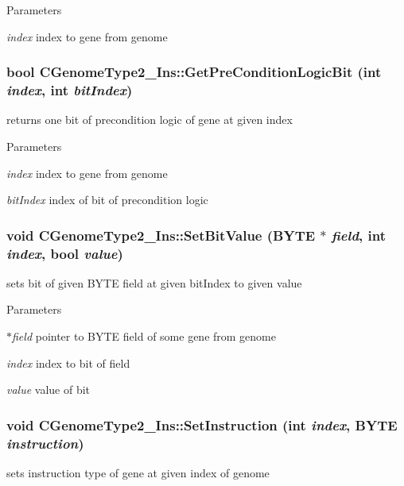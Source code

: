 \begin{DoxyParams}{Parameters}
\item[{\em index}]index to gene from genome \end{DoxyParams}
\hypertarget{classCGenomeType2__Ins_a27038563ce483ebfd7a7a0dd1b19e761}{
\subsubsection[{GetPreConditionLogicBit}]{\setlength{\rightskip}{0pt plus 5cm}bool CGenomeType2\_\-Ins::GetPreConditionLogicBit (int {\em index}, \/  int {\em bitIndex})}}
\label{classCGenomeType2__Ins_a27038563ce483ebfd7a7a0dd1b19e761}
returns one bit of precondition logic of gene at given index


\begin{DoxyParams}{Parameters}
\item[{\em index}]index to gene from genome \item[{\em bitIndex}]index of bit of precondition logic \end{DoxyParams}
\hypertarget{classCGenomeType2__Ins_a2a353438a53537345f463599284f7e9c}{
\subsubsection[{SetBitValue}]{\setlength{\rightskip}{0pt plus 5cm}void CGenomeType2\_\-Ins::SetBitValue (BYTE $\ast$ {\em field}, \/  int {\em index}, \/  bool {\em value})}}
\label{classCGenomeType2__Ins_a2a353438a53537345f463599284f7e9c}
sets bit of given BYTE field at given bitIndex to given value


\begin{DoxyParams}{Parameters}
\item[{\em $\ast$field}]pointer to BYTE field of some gene from genome \item[{\em index}]index to bit of field \item[{\em value}]value of bit \end{DoxyParams}
\hypertarget{classCGenomeType2__Ins_a179553e578b127985d5526360616ac0c}{
\subsubsection[{SetInstruction}]{\setlength{\rightskip}{0pt plus 5cm}void CGenomeType2\_\-Ins::SetInstruction (int {\em index}, \/  BYTE {\em instruction})}}
\label{classCGenomeType2__Ins_a179553e578b127985d5526360616ac0c}
sets instruction type of gene at given index of genome


